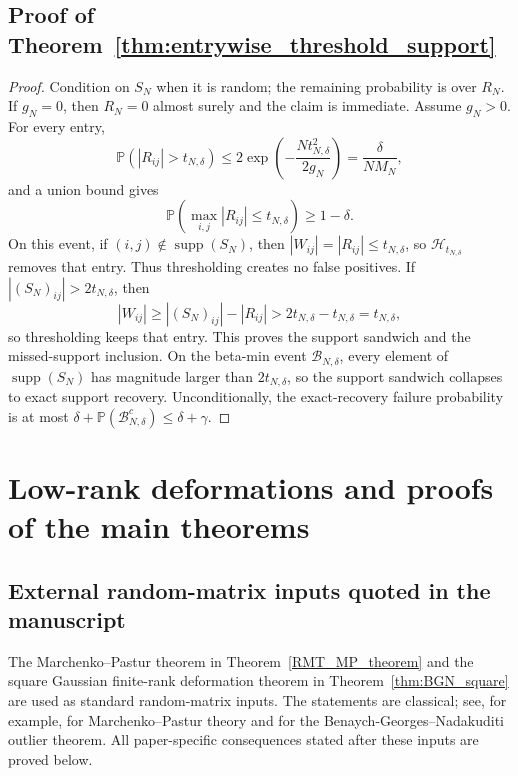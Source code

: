 \documentclass[11pt]{article}
\theoremstyle{plain}
\theoremstyle{definition}
\theoremstyle{remark}
\newcommand{\PP}{\mathbb{P}}
\newcommand{\1}{\mathbf{1}}
\begin{document}
\subsection{Proof of Theorem~\ref{thm:entrywise_threshold_support}}

\begin{proof}
Condition on \(S_N\) when it is random; the remaining probability is over \(R_N\).
If \(g_N=0\), then \(R_N=0\) almost surely and the claim is immediate. Assume \(g_N>0\). 
For every entry,
\[
\PP(|R_{ij}|>t_{N,\delta})
\le
2\exp\!\left(-\frac{Nt_{N,\delta}^2}{2g_N}\right)
=
\frac{\delta}{NM_N},
\]
and a union bound gives
\[
\PP\!\left(\max_{i,j}|R_{ij}|\le t_{N,\delta}\right)\ge1-\delta.
\]
On this event, if \((i,j)\notin\operatorname{supp}(S_N)\), then \(|W_{ij}|=|R_{ij}|\le t_{N,\delta}\), so \(\mathcal H_{t_{N,\delta}}\) removes that entry. Thus thresholding creates no false positives. If \(|(S_N)_{ij}|>2t_{N,\delta}\), then
\[
|W_{ij}|\ge |(S_N)_{ij}|-|R_{ij}|>2t_{N,\delta}-t_{N,\delta}=t_{N,\delta},
\]
so thresholding keeps that entry. This proves the support sandwich and the missed-support inclusion. On the beta-min event \(\mathcal B_{N,\delta}\), every element of \(\operatorname{supp}(S_N)\) has magnitude larger than \(2t_{N,\delta}\), so the support sandwich collapses to exact support recovery. Unconditionally, the exact-recovery failure probability is at most \(\delta+\PP(\mathcal B_{N,\delta}^c)\le\delta+\gamma\).
\end{proof}

\section{Low-rank deformations and proofs of the main theorems}
\label{app:proofs_main}

\subsection{External random-matrix inputs quoted in the manuscript}
\label{app:external_rmt_inputs}

The Marchenko--Pastur theorem in Theorem~\ref{RMT_MP_theorem} and the square Gaussian finite-rank deformation theorem in Theorem~\ref{thm:BGN_square} are used as standard random-matrix inputs. The statements are classical; see, for example, \cite{marchenko1967distribution,vershynin2018high} for Marchenko--Pastur theory and \cite{benaych2012singular} for the Benaych-Georges--Nadakuditi outlier theorem. All paper-specific consequences stated after these inputs are proved below.
\end{document}
